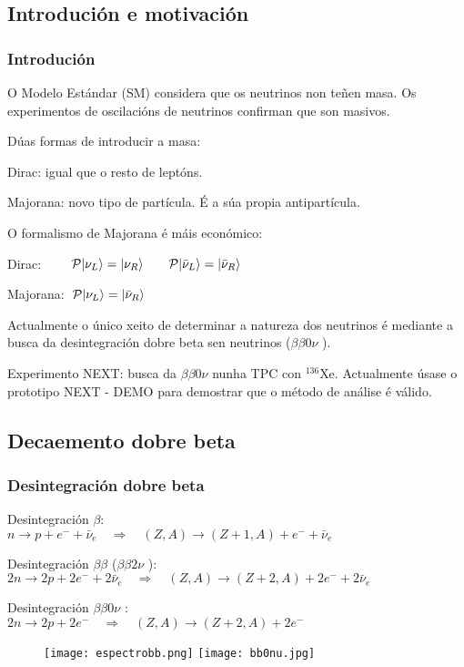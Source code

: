 \documentclass[10pt]{beamer}
\newcommand{\bbcn}[0]{$\beta\beta0\nu$ }
\newcommand{\bbdn}[0]{$\beta\beta2\nu$ }
\begin{document}
\subsection{Introdución e motivación}
\begin{frame} \frametitle{Introdución}

\bi \justifying
\item O Modelo Estándar (SM) considera que os neutrinos non teñen masa. Os experimentos de oscilacións de neutrinos confirman que son masivos.

\item Dúas formas de introducir a masa:
	\bi \justifying
	\item Dirac: igual que o resto de leptóns.
	\item Majorana: novo tipo de partícula. É a súa propia antipartícula.
	\ei

\item O formalismo de Majorana é máis económico:
	\bi
	\item Dirac: $\qquad \mathcal{P} \lvert \nu_L \rangle = \lvert \nu_R \rangle \qquad \mathcal{P} \lvert \bar \nu_L \rangle = \lvert \bar \nu_R \rangle$
	\item Majorana: $\; \mathcal{P} \lvert \nu_L \rangle = \lvert \bar \nu_R \rangle$
	\ei
\item Actualmente o único xeito de determinar a natureza dos neutrinos é mediante a busca da desintegración dobre beta sen neutrinos (\bbcn).

\item Experimento NEXT: busca da \bbcn nunha TPC con $^{136}$Xe. Actualmente úsase o prototipo NEXT - DEMO para demostrar que o método de análise é válido.
\ei
\end{frame}

\subsection{Decaemento dobre beta}

\begin{frame}\frametitle{Desintegración dobre beta}

\bi \justifying
\item Desintegración $\beta$:\\ $n \rightarrow p + e^- + \bar\nu_e \quad \Rightarrow \quad (Z,A) \rightarrow (Z+1,A) + e^- + \bar\nu_e $\smallskip
\item Desintegración $\beta\beta$ (\bbdn):\\ $2n \rightarrow 2p + 2e^- + 2\bar\nu_e \quad \Rightarrow \quad (Z,A) \rightarrow (Z+2,A) + 2e^- + 2\bar\nu_e $
\item Desintegración \bbcn:\\ $2n \rightarrow 2p + 2e^- \quad \Rightarrow \quad (Z,A) \rightarrow (Z+2,A) + 2e^- $
\ei

\begin{figure}
\centering
\texttt{[image: espectrobb.png]}
\texttt{[image: bb0nu.jpg]}
\end{figure}

\end{frame}
\end{document}
